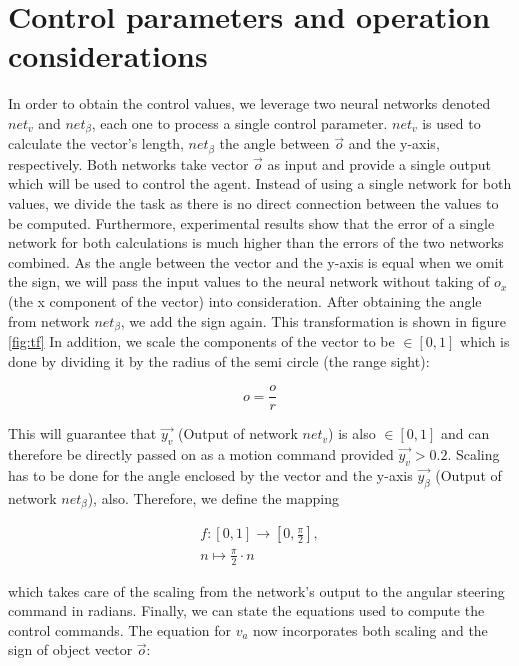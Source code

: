 \documentclass[10pt,a4paper,DIV=11]{scrreprt}
\begin{document}
\section{Control parameters and operation considerations}
In order to obtain the control values, we leverage two neural networks denoted $net_v$ and $net_{\beta}$, each one to process a single control parameter. 
$net_v$ is used to calculate the vector's length, $net_{\beta}$ the angle between $\overrightarrow{o}$ and the y-axis, respectively.
Both networks take 
vector $\overrightarrow{o}$ as input and provide a single output which will be used to control the agent. Instead of using a single network
for both values, we divide the task as there is no direct connection between the values to be computed. Furthermore, experimental results show that
the error of a single network for both calculations is much higher than the errors of the two networks combined. As the angle between
the vector and the y-axis is equal when we omit the sign, we will pass the input values to the neural network without taking of $o_x$ (the x component
of the vector) into consideration. After obtaining the angle from network $net_{\beta}$, we add the sign again. This transformation is shown in figure \ref{fig:tf}
In addition, we scale the components of the vector to be $\in [0,1]$ which is done by dividing it by the radius of the semi circle (the range sight):

\begin{equation}
    o = \frac{o}{r}
\end{equation}

This will guarantee that $\overrightarrow{y_v}$ (Output of network $net_v$) is also $\in [0,1]$ and can therefore
be directly passed on as a motion command provided $\overrightarrow{y_v} > 0.2$. Scaling has to be done for the angle enclosed by the vector and the y-axis 
$\overrightarrow{y_\beta}$ (Output of network $net_\beta$), also. Therefore, we define the mapping

\begin{gather*} 
        f: [0,1] \rightarrow [0,\frac{\pi}{2}], \\ 
        n \mapsto \frac{\pi}{2} \cdot n
\end{gather*}

which takes care of the scaling from the network's output to the angular steering command in radians. Finally, we can state the equations used to
compute the control commands. The equation for $v_a$ now incorporates both scaling and the sign of object vector $\overrightarrow{o}$:
\end{document}
